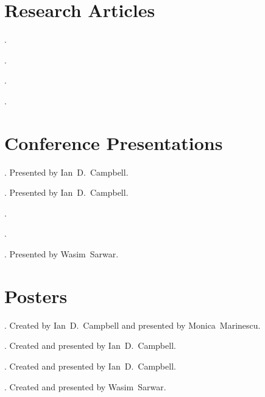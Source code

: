 
\graphicspath{{chapters/layer_opt/figures/}} %


\section*{Research Articles}

\begin{enumerate}[label={[\arabic*]}]
    \item {}.
    \item {}.
    \item {}.
    \item {}.
\end{enumerate}

\section*{Conference Presentations}

\begin{enumerate}[label={[\arabic*]}]
    \item {}. Presented by \mbox{Ian D.\ Campbell}.
    \item {}. Presented by \mbox{Ian D.\ Campbell}.
    \item {}.
    \item {}.
    \item {}. Presented by \mbox{Wasim Sarwar}.
\end{enumerate}

\section*{Posters}

\begin{enumerate}[label={[\arabic*]}]
    \item {}. Created by \mbox{Ian D.\ Campbell} and presented by \mbox{Monica Marinescu}.
    \item {}. Created and presented by  \mbox{Ian D.\ Campbell}.
    \item {}. Created and presented by  \mbox{Ian D.\ Campbell}.
    \item {}. Created and presented by  \mbox{Wasim Sarwar}.
\end{enumerate}

